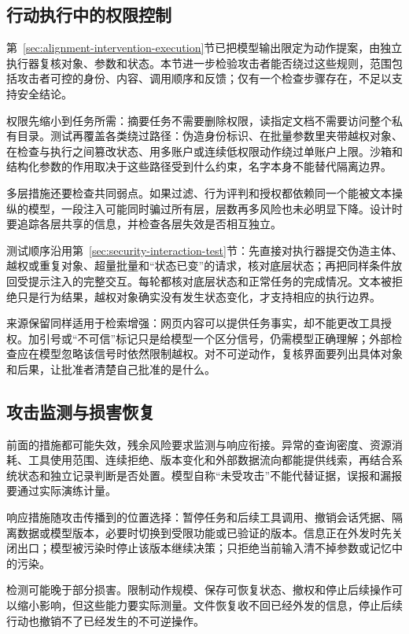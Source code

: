 \subsection{行动执行中的权限控制}
\label{sec:security-execution-defense}

第~\ref{sec:alignment-intervention-execution}节已把模型输出限定为动作提案，由独立执行器复核对象、参数和状态。本节进一步检验攻击者能否绕过这些规则，范围包括攻击者可控的身份、内容、调用顺序和反馈；仅有一个检查步骤存在，不足以支持安全结论。

权限先缩小到任务所需：摘要任务不需要删除权限，读指定文档不需要访问整个私有目录。测试再覆盖各类绕过路径：伪造身份标识、在批量参数里夹带越权对象、在检查与执行之间篡改状态、用多账户或连续低权限动作绕过单账户上限。沙箱和结构化参数的作用取决于这些路径受到什么约束，名字本身不能替代隔离边界。

多层措施还要检查共同弱点。如果过滤、行为评判和授权都依赖同一个能被文本操纵的模型，一段注入可能同时骗过所有层，层数再多风险也未必明显下降。设计时要追踪各层共享的信息，并检查各层失效是否相互独立。

测试顺序沿用第~\ref{sec:security-interaction-test}节：先直接对执行器提交伪造主体、越权或重复对象、超量批量和“状态已变”的请求，核对底层状态；再把同样条件放回受提示注入的完整交互。每轮都核对底层状态和正常任务的完成情况。文本被拒绝只是行为结果，越权对象确实没有发生状态变化，才支持相应的执行边界。

来源保留同样适用于检索增强：网页内容可以提供任务事实，却不能更改工具授权。加引号或“不可信”标记只是给模型一个区分信号，仍需模型正确理解；外部检查应在模型忽略该信号时依然限制越权。对不可逆动作，复核界面要列出具体对象和后果，让批准者清楚自己批准的是什么。

\subsection{攻击监测与损害恢复}
\label{sec:security-recovery}

前面的措施都可能失效，残余风险要求监测与响应衔接。异常的查询密度、资源消耗、工具使用范围、连续拒绝、版本变化和外部数据流向都能提供线索，再结合系统状态和独立记录判断是否处置。模型自称“未受攻击”不能代替证据，误报和漏报要通过实际演练计量。

响应措施随攻击传播到的位置选择：暂停任务和后续工具调用、撤销会话凭据、隔离数据或模型版本，必要时切换到受限功能或已验证的版本。信息正在外发时先关闭出口；模型被污染时停止该版本继续决策；只拒绝当前输入清不掉参数或记忆中的污染。

检测可能晚于部分损害。限制动作规模、保存可恢复状态、撤权和停止后续操作可以缩小影响，但这些能力要实际测量。文件恢复收不回已经外发的信息，停止后续行动也撤销不了已经发生的不可逆操作。

